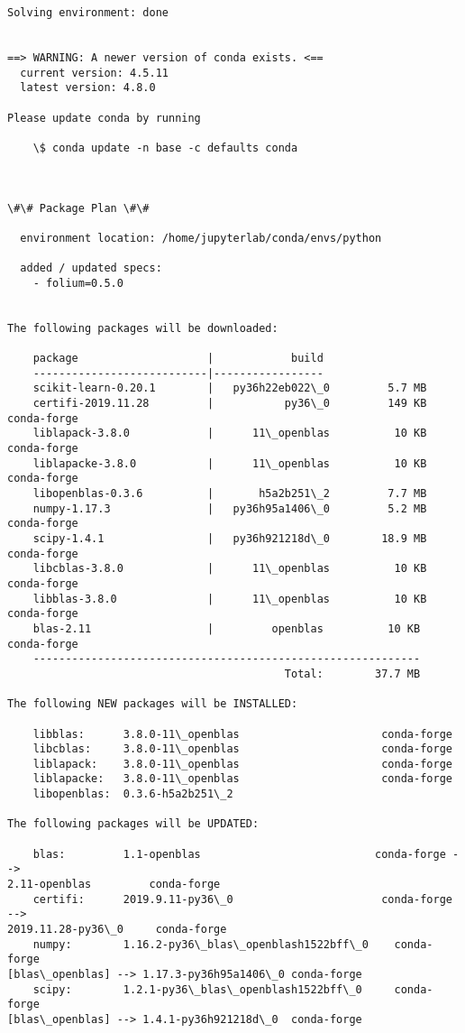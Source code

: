 \documentclass[11pt]{article}
\begin{document}
    \begin{Verbatim}[commandchars=\\\{\}]
Solving environment: done


==> WARNING: A newer version of conda exists. <==
  current version: 4.5.11
  latest version: 4.8.0

Please update conda by running

    \$ conda update -n base -c defaults conda



\#\# Package Plan \#\#

  environment location: /home/jupyterlab/conda/envs/python

  added / updated specs:
    - folium=0.5.0


The following packages will be downloaded:

    package                    |            build
    ---------------------------|-----------------
    scikit-learn-0.20.1        |   py36h22eb022\_0         5.7 MB
    certifi-2019.11.28         |           py36\_0         149 KB  conda-forge
    liblapack-3.8.0            |      11\_openblas          10 KB  conda-forge
    liblapacke-3.8.0           |      11\_openblas          10 KB  conda-forge
    libopenblas-0.3.6          |       h5a2b251\_2         7.7 MB
    numpy-1.17.3               |   py36h95a1406\_0         5.2 MB  conda-forge
    scipy-1.4.1                |   py36h921218d\_0        18.9 MB  conda-forge
    libcblas-3.8.0             |      11\_openblas          10 KB  conda-forge
    libblas-3.8.0              |      11\_openblas          10 KB  conda-forge
    blas-2.11                  |         openblas          10 KB  conda-forge
    ------------------------------------------------------------
                                           Total:        37.7 MB

The following NEW packages will be INSTALLED:

    libblas:      3.8.0-11\_openblas                      conda-forge
    libcblas:     3.8.0-11\_openblas                      conda-forge
    liblapack:    3.8.0-11\_openblas                      conda-forge
    liblapacke:   3.8.0-11\_openblas                      conda-forge
    libopenblas:  0.3.6-h5a2b251\_2

The following packages will be UPDATED:

    blas:         1.1-openblas                           conda-forge -->
2.11-openblas         conda-forge
    certifi:      2019.9.11-py36\_0                       conda-forge -->
2019.11.28-py36\_0     conda-forge
    numpy:        1.16.2-py36\_blas\_openblash1522bff\_0    conda-forge
[blas\_openblas] --> 1.17.3-py36h95a1406\_0 conda-forge
    scipy:        1.2.1-py36\_blas\_openblash1522bff\_0     conda-forge
[blas\_openblas] --> 1.4.1-py36h921218d\_0  conda-forge


\end{Verbatim}
\end{document}
